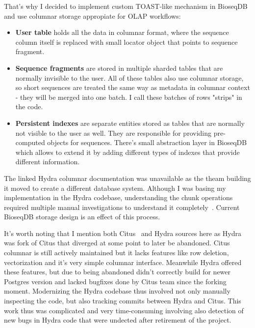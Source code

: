 That's why I decided to implement custom TOAST-like mechanism in BioseqDB and use columnar storage appropiate for OLAP workflows:
\begin{itemize}
  \item \textbf{User table} holds all the data in columnar format, where the sequence column itself is replaced with small locator object that points to sequence fragment.
  \item \textbf{Sequence fragments} are stored in multiple sharded tables that are normally invisible to the user. All of these tables also use columnar storage, so short sequences are treated the same way as metadata in columnar context - they will be merged into one batch. I call these batches of rows "strips" in the code.
  \item \textbf{Persistent indexes} are separate entities stored as tables that are normally not visible to the user as well. They are responsible for providing pre-computed objects for sequences. There's small abstraction layer in BioseqDB which allows to extend it by adding different types of indexes that provide different information.
\label{lst:types-of-storage-entities-in-bioseqdb}
\end{itemize}


The linked Hydra columnar documentation was unavailable as the theam building it moved to create a different database system. 
Although I was basing my implementation in the Hydra codebase, understanding the chunk operations required multiple manual investigations to understand it completely~\autocite{hydra_columnar_source}.
Current BioseqDB storage design is an effect of this process.

It's worth noting that I mention both Citus~\autocite{citus_distributed_2021} and Hydra sources here as Hydra was fork of Citus that diverged at some point to later be abandoned. Citus columnar is still actively maintained but it lacks features like row deletion, vectorization and it's very simple columnar interface.
Meanwhile Hydra offered these features, but due to being abandoned didn't correctly build for newer Postgres version and lacked bugfixes done by Citus team since the forking moment.
Modernizing the Hydra codebase thus involved not only manually inspecting the code, but also tracking commits between Hydra and Citus. This work thus was complicated and very time-consuming involving also detection of new bugs in Hydra code that were undected after retirement of the project.
